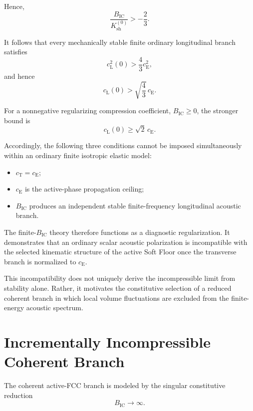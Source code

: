 Hence,
\begin{equation}
    \frac{B_{\mathrm{IC}}}{K_{\mathrm{sh}}^{(0)}} > -\frac{2}{3}.
\end{equation}

It follows that every mechanically stable finite ordinary longitudinal branch satisfies
\begin{equation}
    c_{\mathrm{L}}^2(0) > \frac{4}{3}c_{\mathrm{E}}^2,
\end{equation}
and hence
\begin{equation}
    c_{\mathrm{L}}(0) > \sqrt{\frac{4}{3}}\,c_{\mathrm{E}}.
\end{equation}

For a nonnegative regularizing compression coefficient, $B_{\mathrm{IC}}\geq0$, the stronger bound is
\begin{equation}
    c_{\mathrm{L}}(0) \geq \sqrt{2}\,c_{\mathrm{E}}.
\end{equation}

Accordingly, the following three conditions cannot be imposed simultaneously within an ordinary finite isotropic elastic model:
\begin{itemize}
    \item $c_{\mathrm{T}}=c_{\mathrm{E}}$;
    \item $c_{\mathrm{E}}$ is the active-phase propagation ceiling;
    \item $B_{\mathrm{IC}}$ produces an independent stable finite-frequency longitudinal acoustic branch.
\end{itemize}

The finite-$B_{\mathrm{IC}}$ theory therefore functions as a diagnostic regularization. It demonstrates that an ordinary scalar acoustic polarization is incompatible with the selected kinematic structure of the active Soft Floor once the transverse branch is normalized to $c_{\mathrm{E}}$.

This incompatibility does not uniquely derive the incompressible limit from stability alone. Rather, it motivates the constitutive selection of a reduced coherent branch in which local volume fluctuations are excluded from the finite-energy acoustic spectrum.

\section{Incrementally Incompressible Coherent Branch}
\label{sec:AP_incompressible_branch}

The coherent active-FCC branch is modeled by the singular constitutive reduction
\begin{equation}
    B_{\mathrm{IC}} \rightarrow \infty.
\end{equation}

